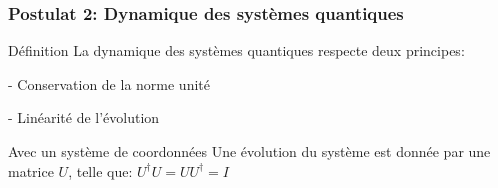\documentclass{beamer}
\begin{document}
\begin{frame}
  \frametitle{Postulat 2: Dynamique des systèmes quantiques}

  \begin{block}{Définition}
    La dynamique des systèmes quantiques respecte deux principes:
    \begin{list}{}
      \item - Conservation de la norme unité
      \item - Linéarité de l'évolution
    \end{list}
  \end{block}

  \begin{block}{Avec un système de coordonnées}
    Une évolution du système est donnée par une matrice $U$, telle que: $U^{\dagger}U = UU^{\dagger} = I$
  \end{block}

\end{frame}
\end{document}
